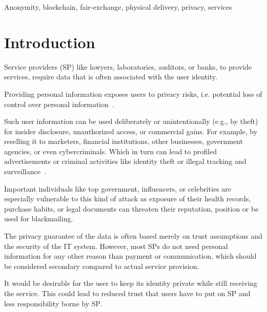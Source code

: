 \documentclass{ieeeaccess}
\begin{document}
\begin{keywords}
Anonymity, blockchain, fair-exchange, physical delivery, privacy, services
\end{keywords}

\titlepgskip=-15pt

\maketitle
\section{Introduction}
Service providers (SP) like lawyers, laboratories, auditors, or banks,
to provide services, require data that is often associated with the user
identity.

Providing personal information exposes users to privacy risks,
i.e. potential loss of control over personal
information~\cite{smith2011information}.

Such user information can be used deliberately or unintentionally
(e.g., by theft) for insider disclosure, unauthorized access, or
commercial gains. For example, by reselling it to marketers, financial institutions, other businesses, government agencies, or even cybercriminals. Which in turn can lead to profiled advertisements or criminal activities like identity theft or illegal tracking and surveillance~\cite{smith2011information}.

Important individuals like top government, influencers, or celebrities are especially vulnerable to this kind of attack as exposure of their health records, purchase habits, or legal documents can threaten their reputation, position or be used for blackmailing.

The privacy guarantee of the data is often based merely on trust assumptions and the security of the IT system. However, most SPs do not need personal information for any other reason than payment or communication, which should be considered secondary compared to actual service provision.

It would be desirable for the user to keep its identity private while still receiving the service. This could lead to reduced trust that users have to put on SP and less responsibility borne by SP.
\end{document}
